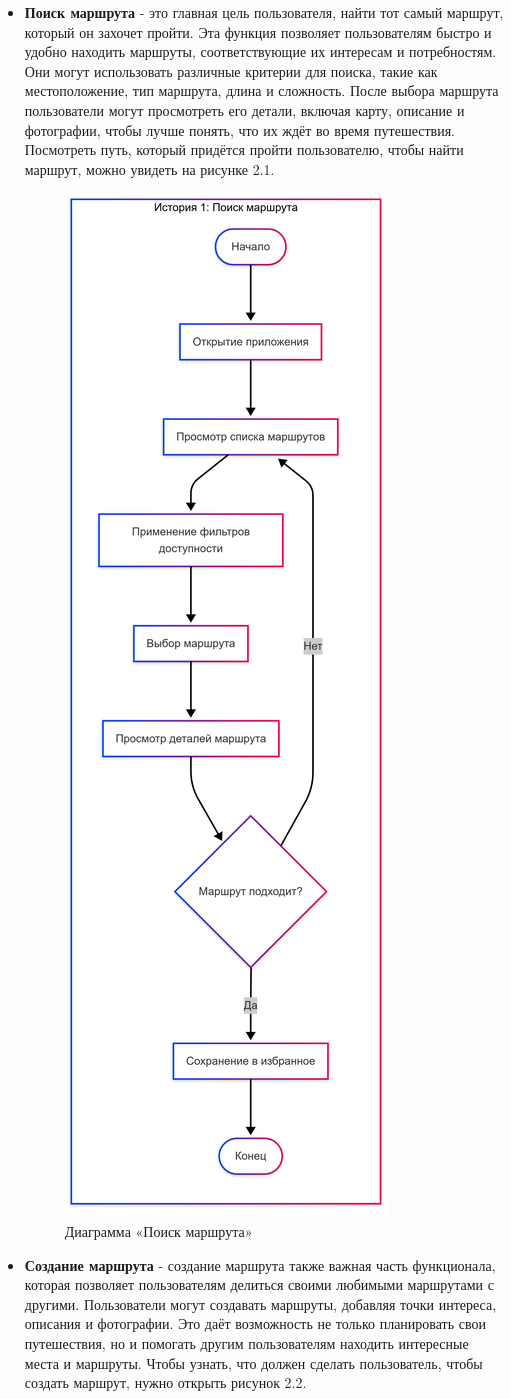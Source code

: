 \begin{itemize}
    \item \textbf{Поиск маршрута} - это главная цель  пользователя, найти тот самый маршрут, который он захочет пройти. Эта функция позволяет пользователям быстро и удобно находить маршруты, соответствующие их интересам и потребностям. Они могут использовать различные критерии для поиска, такие как местоположение, тип маршрута, длина и сложность. После выбора маршрута пользователи могут просмотреть его детали, включая карту, описание и фотографии, чтобы лучше понять, что их ждёт во время путешествия. Посмотреть путь, который придётся пройти пользователю, чтобы найти маршрут, можно увидеть на рисунке 2.1.
    \begin{figure}[H]
        \centering
        \includegraphics[width=0.4\linewidth]{Images/mobile_logic/история_поиск_маршрута-2025-04-13-175239.png}
        \caption{Диаграмма «Поиск маршрута»}
        \label{fig:enter-label}
    \end{figure}
    \item \textbf{Создание маршрута} - создание маршрута также важная часть функционала, которая позволяет пользователям делиться своими любимыми маршрутами с другими. Пользователи могут создавать маршруты, добавляя точки интереса, описания и фотографии. Это даёт возможность не только планировать свои путешествия, но и помогать другим пользователям находить интересные места и маршруты. Чтобы узнать, что должен сделать пользователь, чтобы создать маршрут, нужно открыть рисунок 2.2.

\end{itemize}
